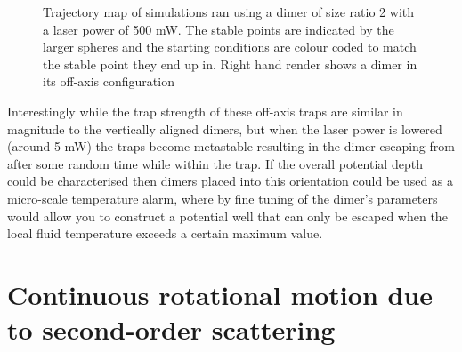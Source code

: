 \begin{figure}[h!]
\begin{subfigure}{0.32\linewidth}
		\caption{}
	\end{subfigure}
	\captionsetup{hangindent=2.35cm}
	\caption{Trajectory map of simulations ran using a dimer of size ratio 2 with a laser power of 500 mW. The stable points are indicated by the larger spheres and the starting conditions are colour coded to match the stable point they end up in. Right hand render shows a dimer in its off-axis configuration}
\end{figure}
Interestingly while the trap strength of these off-axis traps are 
similar in magnitude to the vertically aligned dimers, but when 
the laser power is lowered (around 5 mW) the traps become metastable 
resulting in the dimer escaping from after some random time while 
within the trap. If the overall potential depth could be characterised 
then dimers placed into this orientation could be used as a 
micro-scale temperature alarm, where by fine tuning of the dimer's 
parameters would allow you to construct a potential well that can 
only be escaped when the local fluid temperature exceeds a certain maximum value.  

\section{Continuous rotational motion due to second-order scattering}

